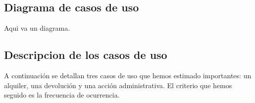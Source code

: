 \documentclass[11pt,a4paper]{article}
\begin{document}
\subsection{Diagrama de casos de uso}
Aqui va un diagrama.


\subsection{Descripcion de los casos de uso}
A continuación se detallan tres casos de uso que hemos estimado importantes: un alquiler, una devolución y una acción administrativa. El criterio que hemos seguido es la frecuencia de ocurrencia.
\end{document}
